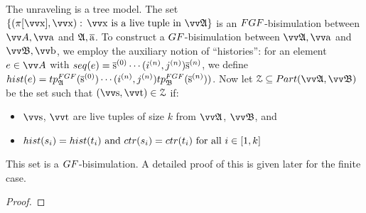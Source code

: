 \thminfunraveling*
\begin{proofsketch}
  The unraveling is a tree model.
  The set $\{(\pi[\elemtuptuplex], \elemtuptuplex):\, \elemtuptuplex\ \text{is a live tuple in}\ \unravel{A} \}$ is an $\FGF$-bisimulation between $\unraveldom{A}, \elemtuptuplea$ and ${\mathfrak{A}}, \overline{\mathrm{a}}$.
  To construct a $\GF$-bisimulation between $\unravel{A}, \elemtuptuplea$ and $\unravel{B}, \elemtuptupleb$, we employ the auxiliary notion of ``histories'': for an element $e \in \unraveldom{A}$ with $\seq{e} = \elemtuples^{(0)}\cdots(i^{(n)}, j^{(n)})\elemtuples^{(n)}$, we define $\mathsf{hist}(e) = \tp{\FGF}{\str{A}}{\elemtuples^{(0)}} \cdots (i^{(n)}, j^{(n)}) \tp{\FGF}{\str{B}}{\elemtuples^{(n)}})$.
  Now let $\bisimZ \subseteq \PartIso{\unravel{A}}{\unravel{B}}$ be the set such that $(\elemtuptuples, \elemtuptuplet) \in \bisimZ$ if:
  \begin{itemize}
    \item $\elemtuptuples$, $\elemtuptuplet$ are live tuples of size $k$ from $\unravel{A}$, $\unravel{B}$, and
    \item $\mathsf{hist}(s_{i}) = \mathsf{hist}(t_{i})\text{ and }\ctr{s_{i}} = \ctr{t_{i}}\text{ for all }i \in [1, k]$
  \end{itemize}
  This set is a $\GF$-bisimulation.
  A detailed proof of this is given later for the finite case.
\end{proofsketch}
\begin{proof}
\end{proof}

